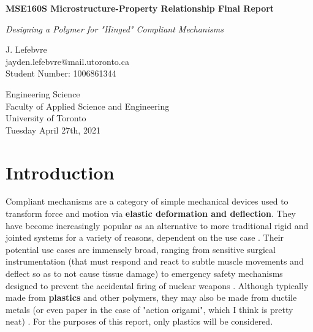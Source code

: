 \documentclass{report}
\begin{document}
\begin{titlepage}
    \begin{center}
        \vspace*{1cm}
 
        \textbf{MSE160S Microstructure-Property Relationship Final Report}
 
        \vspace{0.5cm}
        \textit{Designing a Polymer for "Hinged" Compliant Mechanisms}
             
        \vspace{1.5cm}
 
        J. Lefebvre\\\small{jayden.lefebvre@mail.utoronto.ca}\\\small{Student Number: 1006861344}
 
        \vfill
             
        \vspace{0.8cm}
             
        Engineering Science\\
        Faculty of Applied Science and Engineering\\
        University of Toronto\\
        Tuesday April 27th, 2021
             
    \end{center}
 \end{titlepage}


\section{Introduction}

Compliant mechanisms are a category of simple mechanical devices used to transform force and motion via \textbf{elastic deformation and deflection}.
They have become increasingly popular as an alternative to more traditional rigid and jointed systems for a variety of reasons, dependent on the use case \cite{compliant}.
Their potential use cases are immensely broad, ranging from sensitive surgical instrumentation (that must respond and react to subtle muscle movements and deflect so as to not cause tissue damage) to emergency safety mechanisms designed to prevent the accidental firing of nuclear weapons \cite{invention}.
Although typically made from \textbf{plastics} and other polymers, they may also be made from ductile metals (or even paper in the case of "action origami", which I think is pretty neat) \cite{invention}. For the purposes of this report, only plastics will be considered.
\vspace{1cm}
\end{document}
